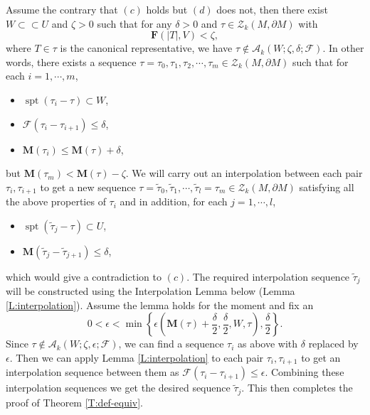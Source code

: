 \documentclass[10pt]{amsart}
\theoremstyle{definition}
\theoremstyle{remark}
\numberwithin{equation}{section}
\newcommand{\F}{\mathcal{F}}
\newcommand{\de}{\delta}
\newcommand{\ep}{\epsilon}
\newcommand{\ti}{\tilde}
\newcommand{\Z}{\mathcal{Z}}
\newcommand{\M}{\mathbf{M}}
\newcommand{\mF}{\mathbf{F}}
\newcommand{\sA}{\mathscr{A}}
\newcommand{\spt}{\operatorname{spt}}
\begin{document}
Assume the contrary that $(c)$ holds but $(d)$ does not, then there exist $W \subset \subset U$ and $\zeta>0$ such that for any $\de>0$ and $\tau\in \Z_k(M, \partial M)$ with
\[\mF(|T|, V)<\zeta,\]
where $T \in \tau$ is the canonical representative, we have $\tau\notin \sA_k(W; \zeta, \de; \F)$. In other words, there exists a sequence $\tau=\tau_0, \tau_1, \tau_2, \cdots, \tau_m\in\Z_k(M, \partial M)$ such that for each $i=1, \cdots, m$,
\begin{itemize}
\item $\spt(\tau_i-\tau)\subset W$,
\item $\F(\tau_i - \tau_{i+1})\leq \de$,
\item $\M(\tau_i)\leq \M(\tau)+\de$, 
\end{itemize}
but $\M(\tau_m)< \M(\tau)-\zeta$. 
We will carry out an interpolation between each pair $\tau_i, \tau_{i+1}$ to get a new sequence $\tau=\ti{\tau}_0, \ti{\tau}_1, \cdots, \ti{\tau}_l=\tau_m\in\Z_k(M, \partial M)$ satisfying all the above properties of $\tau_i$ and in addition, for each $j=1,\cdots,l$,
\begin{itemize}
\item $\spt(\ti{\tau}_j-\tau)\subset U$,
\item $\M(\ti{\tau}_j- \ti{\tau}_{j+1})\leq \de$,
\end{itemize}
which would give a contradiction to $(c)$.
The required interpolation sequence $\ti{\tau}_j$ will be constructed using the Interpolation Lemma below (Lemma \ref{L:interpolation}). Assume the lemma holds for the moment and fix an
\[ 0< \ep < \min \left\{ \ep \left(\M(\tau)+ \frac{\de}{2}, \frac{\de}{2}, W,\tau\right), \frac{\de}{2} \right\}.\]
Since $\tau \notin \sA_k(W;\zeta, \ep; \F)$, we can find a sequence $\tau_i$ as above with $\de$ replaced by $\ep$.  Then we can apply Lemma \ref{L:interpolation} to each pair $\tau_i, \tau_{i+1}$ to get an interpolation sequence between them as $\F(\tau_i- \tau_{i+1})\leq \ep$.  Combining these interpolation sequences we get the desired sequence $\ti{\tau}_j$. This then completes the proof of Theorem \ref{T:def-equiv}.
\end{document}
